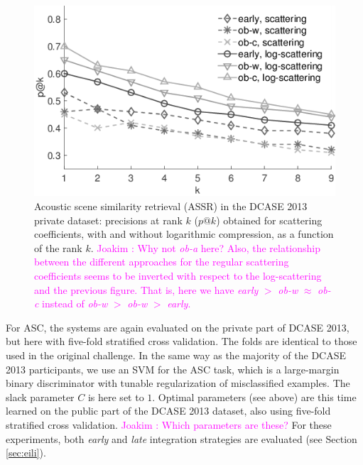 \documentclass[journal]{IEEEtran}
\newcommand{\ja}[1]{\textcolor{magenta}{Joakim : #1}}
\begin{document}

\begin{figure}[t]
\begin{center}
\includegraphics[width=.9\columnwidth]{bw/unsupervised_test1}
\caption{Acoustic scene similarity retrieval (ASSR) in the DCASE 2013 private dataset: precisions at rank $k$ ($p@k$) obtained for scattering coefficients, with and without logarithmic compression, as a function of the rank $k$. \ja{Why not \emph{ob-a} here? Also, the relationship between the different approaches for the regular scattering coefficients seems to be inverted with respect to the log-scattering and the previous figure. That is, here we have \emph{early} $>$ \emph{ob-w} $\approx$ \emph{ob-c} instead of \emph{ob-w} $>$ \emph{ob-w} $>$ \emph{early}.}}
\label{fig:ASS_2}
\end{center}
\end{figure}

For ASC, the systems are again evaluated on the private part of DCASE 2013, but here with five-fold stratified cross validation. The folds are identical to those used in the original challenge. In the same way as the majority of the DCASE 2013 participants, we use an SVM for the ASC task, which is a large-margin binary discriminator with tunable regularization of misclassified examples. The slack parameter $C$ is here set to $1$. Optimal parameters (see above) are this time learned on the public part of the DCASE 2013 dataset, also using five-fold stratified cross validation. \ja{Which parameters are these?} For these experiments, both \emph{early} and \emph{late} integration strategies are evaluated (see Section \ref{sec:eili}).
\end{document}

